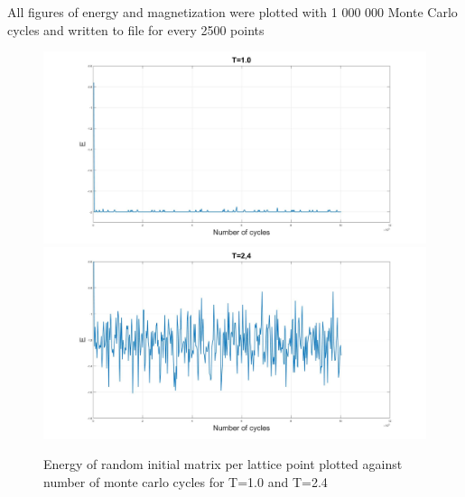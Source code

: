 \documentclass[10pt,a4paper]{article}
\begin{document}
\noindent All figures of energy and magnetization were plotted with 1 000 000 Monte Carlo cycles and written to file for every 2500 points 


\begin{figure} [H]
\centerline{
\includegraphics[scale=0.15]{RANDOMenergy1.jpg}
\includegraphics[scale=0.15]{RANDOMenergy24.jpg}
}
\caption{Energy of random initial matrix per lattice point plotted against number of monte carlo cycles for T=1.0 and T=2.4}
\label{fig:RandomEnergy}
\end{figure}
\end{document}
